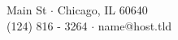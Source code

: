 \documentclass{article}
\begin{document}
 Main St $\cdot$ Chicago, IL 60640 \\
	(124) 816 - 3264 $\cdot$ name@host.tld \\
\end{document}
